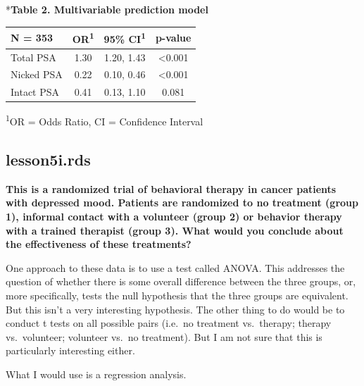 \documentclass[]{book}
\begin{document}
*\textbf{Table 2. Multivariable prediction model}

\captionsetup[table]{labelformat=empty,skip=1pt}
\begin{longtable}{lccc}
\toprule
\textbf{N = 353} & \textbf{OR}\textsuperscript{1} & \textbf{95\% CI}\textsuperscript{1} & \textbf{p-value} \\ 
\midrule
Total PSA & 1.30 & 1.20, 1.43 & <0.001 \\ 
Nicked PSA & 0.22 & 0.10, 0.46 & <0.001 \\ 
Intact PSA & 0.41 & 0.13, 1.10 & 0.081 \\ 
\bottomrule
\end{longtable}
\vspace{-5mm}
\begin{minipage}{\linewidth}
\textsuperscript{1}OR = Odds Ratio, CI = Confidence Interval \\ 
\end{minipage}

\hypertarget{lesson5i.rds}{%
\subsection{lesson5i.rds}\label{lesson5i.rds}}

\textbf{This is a randomized trial of behavioral therapy in cancer patients with depressed mood. Patients are randomized to no treatment (group 1), informal contact with a volunteer (group 2) or behavior therapy with a trained therapist (group 3). What would you conclude about the effectiveness of these treatments?}

One approach to these data is to use a test called ANOVA. This addresses the question of whether there is some overall difference between the three groups, or, more specifically, tests the null hypothesis that the three groups are equivalent. But this isn't a very interesting hypothesis. The other thing to do would be to conduct t tests on all possible pairs (i.e.~no treatment vs.~therapy; therapy vs.~volunteer; volunteer vs.~no treatment). But I am not sure that this is particularly interesting either.

What I would use is a regression analysis.
\end{document}
